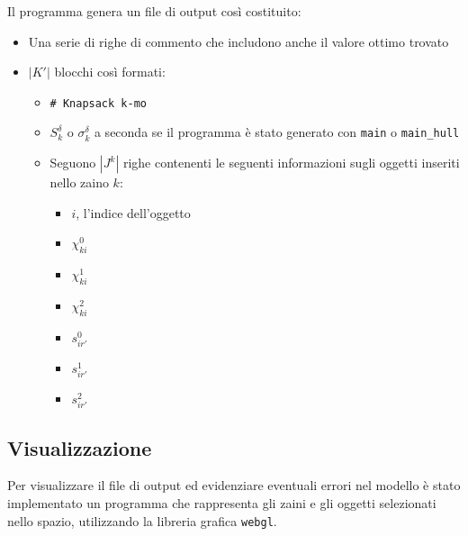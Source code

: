 \documentclass{scrartcl}
\begin{document}
Il programma genera un file di output così costituito:
\begin{itemize}
	\item Una serie di righe di commento che includono anche il valore ottimo trovato
	\item $|K'|$ blocchi così formati:
		\begin{itemize}
			\item \verb|# Knapsack k-mo|
			\item $S_k^\delta$ o $\sigma_k^\delta$ a seconda se il programma è stato generato con \verb|main| o \verb|main_hull|
			\item Seguono $|J^k|$ righe contenenti le seguenti informazioni sugli oggetti inseriti nello zaino $k$:
			\begin{itemize}
				\item $i$, l'indice dell'oggetto
				\item $\chi_{ki}^0$
				\item $\chi_{ki}^1$
				\item $\chi_{ki}^2$
				\item $s_{ir'}^0$
				\item $s_{ir'}^1$
				\item $s_{ir'}^2$
			\end{itemize}
		\end{itemize}
\end{itemize}

\subsection{Visualizzazione}
Per visualizzare il file di output ed evidenziare eventuali errori nel modello è stato implementato un programma che rappresenta gli zaini e gli oggetti selezionati nello spazio, utilizzando la libreria grafica \verb|webgl|.
\end{document}
